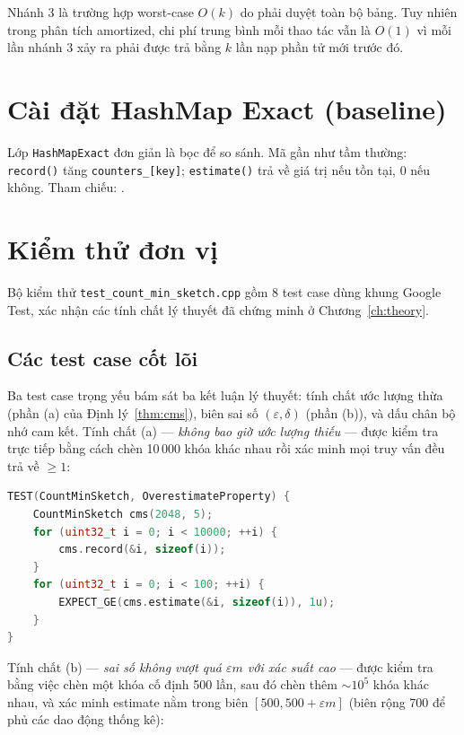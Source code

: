 Nhánh 3 là trường hợp worst-case $O(k)$ do phải duyệt toàn bộ bảng. Tuy nhiên trong phân tích amortized, chi phí trung bình mỗi thao tác vẫn là $O(1)$ vì mỗi lần nhánh 3 xảy ra phải được trả bằng $k$ lần nạp phần tử mới trước đó.

\section{Cài đặt HashMap Exact (baseline)}

Lớp \texttt{HashMapExact} đơn giản là bọc  để so sánh. Mã gần như tầm thường: \texttt{record()} tăng \texttt{counters\_[key]}; \texttt{estimate()} trả về giá trị nếu tồn tại, $0$ nếu không. Tham chiếu: .

\section{Kiểm thử đơn vị}

Bộ kiểm thử \texttt{test\_count\_min\_sketch.cpp} gồm 8 test case dùng khung Google Test, xác nhận các tính chất lý thuyết đã chứng minh ở Chương~\ref{ch:theory}.

\subsection{Các test case cốt lõi}

Ba test case trọng yếu bám sát ba kết luận lý thuyết: tính chất ước lượng thừa (phần (a) của Định lý~\ref{thm:cms}), biên sai số $(\varepsilon, \delta)$ (phần (b)), và dấu chân bộ nhớ cam kết. Tính chất (a) --- \textit{không bao giờ ước lượng thiếu} --- được kiểm tra trực tiếp bằng cách chèn 10\,000 khóa khác nhau rồi xác minh mọi truy vấn đều trả về $\ge 1$:

\begin{lstlisting}[language=C++, caption={Xác nhận overestimate property}, label=lst:test-overest]
TEST(CountMinSketch, OverestimateProperty) {
    CountMinSketch cms(2048, 5);
    for (uint32_t i = 0; i < 10000; ++i) {
        cms.record(&i, sizeof(i));
    }
    for (uint32_t i = 0; i < 100; ++i) {
        EXPECT_GE(cms.estimate(&i, sizeof(i)), 1u);
    }
}
\end{lstlisting}

Tính chất (b) --- \textit{sai số không vượt quá $\varepsilon m$ với xác suất cao} --- được kiểm tra bằng việc chèn một khóa cố định 500 lần, sau đó chèn thêm $\sim 10^5$ khóa khác nhau, và xác minh estimate nằm trong biên $[500, 500 + \varepsilon m]$ (biên rộng 700 để phủ các dao động thống kê):

